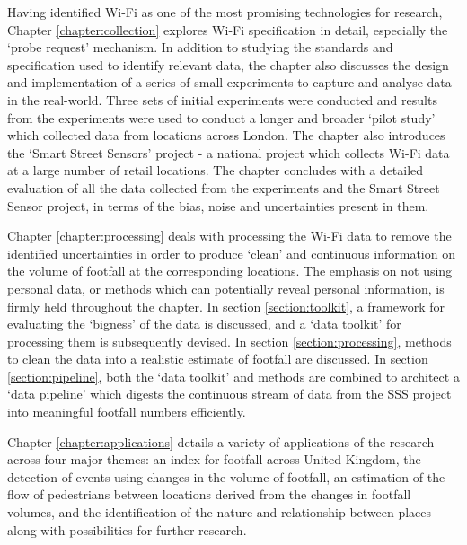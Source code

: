 Having identified Wi-Fi as one of the most promising technologies for research, Chapter \ref{chapter:collection} explores Wi-Fi specification in detail, especially the `probe request' mechanism.
In addition to studying the standards and specification used to identify relevant data, the chapter also discusses the design and implementation of a series of small experiments to capture and analyse data in the real-world.
Three sets of initial experiments were conducted and results from the experiments were used to conduct a longer and broader `pilot study' which collected data from locations across London.
The chapter also introduces the `Smart Street Sensors' project - a national project which collects Wi-Fi data at a large number of retail locations.
The chapter concludes with a detailed evaluation of all the data collected from the experiments and the Smart Street Sensor project, in terms of the bias, noise and uncertainties present in them.

Chapter \ref{chapter:processing} deals with processing the Wi-Fi data to remove the identified uncertainties in order to produce `clean' and continuous information on the volume of footfall at the corresponding locations.
The emphasis on not using personal data, or methods which can potentially reveal personal information, is firmly held throughout the chapter.
In section \ref{section:toolkit}, a framework for evaluating the `bigness' of the data is discussed, and a `data toolkit' for processing them is subsequently devised.
In section \ref{section:processing}, methods to clean the data into a realistic estimate of footfall are discussed.
In section \ref{section:pipeline}, both the `data toolkit' and methods are combined to architect a `data pipeline' which digests the continuous stream of data from the SSS project into meaningful footfall numbers efficiently.

Chapter \ref{chapter:applications} details a variety of applications of the research across four major themes: an index for footfall across United Kingdom, the detection of events using changes in the volume of footfall, an estimation of the flow of pedestrians between locations derived from the changes in footfall volumes, and the identification of the nature and relationship between places along with possibilities for further research.

